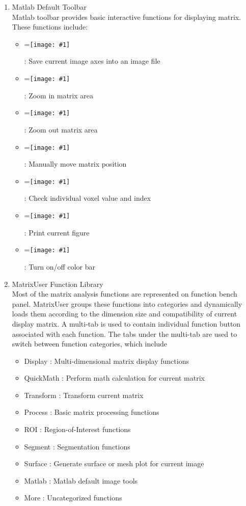 \documentclass{book}%
\newcommand{\vcenteredinclude}[1]{
\begingroup
\setbox0=\hbox{\texttt{[image: \#1]}}
\parbox{\wd0}{\box0}\endgroup}
\begin{document}
\begin{enumerate}

	\item Matlab Default Toolbar  \\
	
	Matlab toolbar provides basic interactive functions for displaying matrix. These functions include:
	
	\begin{itemize}
		\item \vcenteredinclude{Pictures/SaveFig.eps} : Save current image axes into an image file
		\item \vcenteredinclude{Pictures/ZoomIn.eps} : Zoom in matrix area
		\item \vcenteredinclude{Pictures/ZoomOut.eps} : Zoom out matrix area
		\item \vcenteredinclude{Pictures/Pan.eps} : Manually move matrix position
		\item \vcenteredinclude{Pictures/DataCursor.eps} : Check individual voxel value and index
		\item \vcenteredinclude{Pictures/Print.eps} : Print current figure
		\item \vcenteredinclude{Pictures/Colorbar.eps} : Turn on/off color bar
	\end{itemize}
	
	\item MatrixUser Function Library \\
	
	Most of the matrix analysis functions are represented on function bench panel. MatrixUser groups these functions into categories and dynamically loads them according to
	the dimension size and compatibility of current display matrix. A multi-tab is used to contain individual function button associated with each function. 
	The tabs under the multi-tab are used to switch between function categories, which include
	
	\begin{itemize}
		\item Display : Multi-dimensional matrix display functions
		\item QuickMath : Perform math calculation for current matrix
		\item Transform : Transform current matrix
		\item Process : Basic matrix processing functions
		\item ROI : Region-of-Interest functions
		\item Segment : Segmentation functions
		\item Surface : Generate surface or mesh plot for current image
		\item Matlab : Matlab default image tools
		\item More : Uncategorized functions
	\end{itemize}
	

\end{enumerate}
\end{document}

